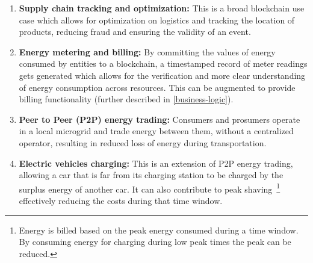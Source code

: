 \begin{enumerate}
    \item \textbf{Supply chain tracking and optimization:} This is a broad blockchain use case which allows for optimization on logistics and tracking the location of products, reducing fraud and ensuring the validity of an event.
    \item \textbf{Energy metering and billing:} By committing the values of energy consumed by entities to a blockchain, a timestamped record of meter readings gets generated which allows for the verification and more clear understanding of energy consumption across resources. This can be augmented to provide billing functionality (further described in \ref{business-logic}).
    \item \textbf{Peer to Peer (P2P) energy trading:} Consumers and prosumers operate in a local microgrid and trade energy between them, without a centralized operator, resulting in reduced loss of energy during transportation.
    \item \textbf{Electric vehicles charging:} This is an extension of P2P energy trading, allowing a car that is far from its charging station to be charged by the surplus energy of another car. It can also contribute to peak shaving~\footnote{Energy is billed based on the peak energy consumed during a time window. By consuming energy for charging during low peak times the peak can be reduced.} effectively reducing the costs during that time window.
\end{enumerate}





